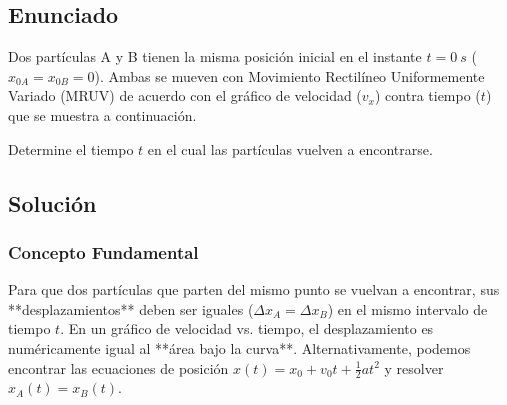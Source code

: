\documentclass[12pt, a4paper]{article}
\begin{document}
\newpage

\subsection*{Enunciado}
Dos partículas A y B tienen la misma posición inicial en el instante $t = \SI{0}{s}$ ($x_{0A} = x_{0B} = 0$). Ambas se mueven con Movimiento Rectilíneo Uniformemente Variado (MRUV) de acuerdo con el gráfico de velocidad ($v_x$) contra tiempo ($t$) que se muestra a continuación.

Determine el tiempo $t$ en el cual las partículas vuelven a encontrarse.

\begin{center}
\end{center}

\subsection*{Solución}

\subsubsection*{Concepto Fundamental}
Para que dos partículas que parten del mismo punto se vuelvan a encontrar, sus **desplazamientos** deben ser iguales ($\Delta x_A = \Delta x_B$) en el mismo intervalo de tiempo $t$.
En un gráfico de velocidad vs. tiempo, el desplazamiento es numéricamente igual al **área bajo la curva**.
Alternativamente, podemos encontrar las ecuaciones de posición $x(t) = x_0 + v_0 t + \frac{1}{2}at^2$ y resolver $x_A(t) = x_B(t)$.
\end{document}
